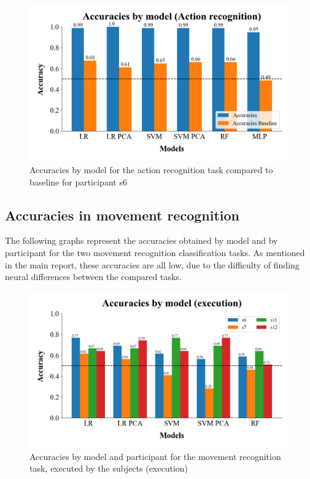 \documentclass[10pt,conference,compsocconf]{IEEEtran}
\begin{document}
\begin{figure}[h!]
    \center
    \includegraphics[width=\linewidth]{../Code/figures/accuracies_ExObs.png}
    \caption{Accuracies by model for the action recognition task compared to baseline for participant s6}
    \label{appfig:accuracies_ExObs}
\end{figure}
\FloatBarrier

\subsection{Accuracies in movement recognition}
The following graphs represent the accuracies obtained by model and by participant for the two movement recognition classification tasks. As mentioned in the main report, these accuracies are all low, due to the difficulty of finding neural differences between the compared tasks.

\begin{figure}[h!]
    \center
    \includegraphics[width=\linewidth]{../Code/figures/accuracies_across_part_ex.png}
    \caption{Accuracies by model and participant for the movement recognition task, executed by the subjects (execution)}
    \label{appfig:accuracies_across_part_ex}
\end{figure}
\FloatBarrier
\end{document}
